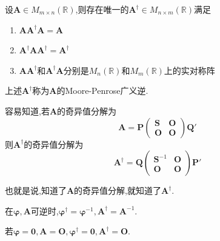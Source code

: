 \begin{formal}
    \begin{theorem}\label{def:Moore-Penrose广义逆}
        设$\bm{A}\in M_{m\times n}\left(\mathbb{R}\right)$,则存在唯一的$\bm{A}^{\dagger}\in M_{n\times m}\left(\mathbb{R}\right)$满足\begin{enumerate}[label=\textup{(\arabic*)}]
            \item $\bm{AA}^{\dagger}\bm{A}=\bm{A}$
            \item $\bm{A}^{\dagger}\bm{AA}^{\dagger}=\bm{A}^{\dagger}$
            \item $\bm{AA}^{\dagger}$和$\bm{A}^{\dagger}\bm{A}$分别是$M_n\left(\mathbb{R}\right)$和$M_m\left(\mathbb{R}\right)$上的实对称阵
        \end{enumerate}上述$\bm{A}^{\dagger}$称为$\bm{A}$的\textup{Moore-Penrose}广义逆.
    \end{theorem}
\end{formal}
容易知道,若$\bm{A}$的奇异值分解为\[
\bm{A}=\bm{P}\begin{pmatrix}
    \bm{S}&\bm{O}\\
    \bm{O}&\bm{O}
\end{pmatrix}\bm{Q}'
\]则$\bm{A}^{\dagger}$的奇异值分解为\[
\bm{A}^{\dagger}=\bm{Q}\begin{pmatrix}
    \bm{S}^{-1}&\bm{O}\\
    \bm{O}&\bm{O}
\end{pmatrix}\bm{P}'
\]
\begin{red}
    \begin{remark}
    也就是说,知道了$\bm{A}$的奇异值分解,就知道了$\bm{A}^{\dagger}$.
    \end{remark}\end{red}
\begin{red}
    \begin{remark}
        在$\bm{\varphi},\bm{A}$可逆时,$\bm{\varphi}^{\dagger}=\bm{\varphi}^{-1},\bm{A}^{\dagger}=\bm{A}^{-1}$.
    \end{remark}
\end{red}
\begin{red}
    \begin{remark}
        若$\bm{\varphi}=\bm{0},\bm{A}=\bm{O},\bm{\varphi}^{\dagger}=\bm{0},\bm{A}^{\dagger}=\bm{O}.$
    \end{remark}
\end{red}
